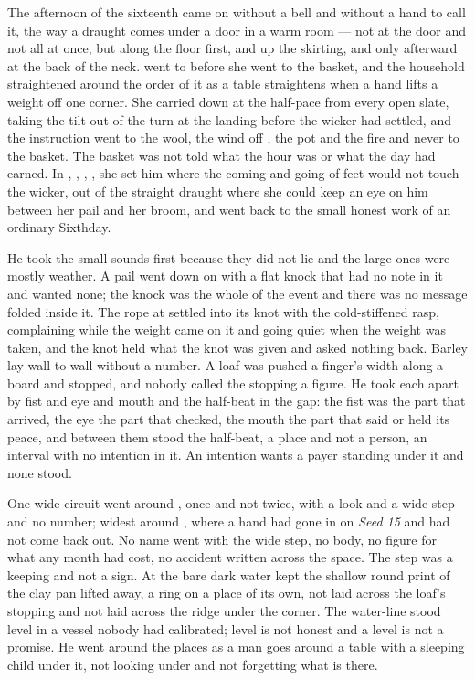 The afternoon of the sixteenth came on without a bell and without a hand to call it, the way a draught comes under a door in a warm room --- not at the door and not all at once, but along the floor first, and up the skirting, and only afterward at the back of the neck.  went to  before she went to the basket, and the household straightened around the order of it as a table straightens when a hand lifts a weight off one corner. She carried  down  at the half-pace from every open slate, taking the tilt out of the turn at the landing before the wicker had settled, and the instruction went to the wool, the wind off , the pot and the fire and never to the basket. The basket was not told what the hour was or what the day had earned. In , , , , she set him where the coming and going of feet would not touch the wicker, out of the straight draught where she could keep an eye on him between her pail and her broom, and went back to the small honest work of an ordinary Sixthday.

He took the small sounds first because they did not lie and the large ones were mostly weather. A pail went down on  with a flat knock that had no note in it and wanted none; the knock was the whole of the event and there was no message folded inside it. The rope at  settled into its knot with the cold-stiffened rasp, complaining while the weight came on it and going quiet when the weight was taken, and the knot held what the knot was given and asked nothing back. Barley lay wall to wall without a number. A loaf was pushed a finger's width along a board and stopped, and nobody called the stopping a figure. He took each apart by fist and eye and mouth and the half-beat in the gap: the fist was the part that arrived, the eye the part that checked, the mouth the part that said or held its peace, and between them stood the half-beat, a place and not a person, an interval with no intention in it. An intention wants a payer standing under it and none stood.

One wide circuit went around , once and not twice, with a look and a wide step and no number; widest around , where a hand had gone in on \emph{Seed 15} and had not come back out. No name went with the wide step, no body, no figure for what any month had cost, no accident written across the space. The step was a keeping and not a sign. At  the bare dark water kept the shallow round print of the clay pan lifted away, a ring on a place of its own, not laid across the loaf's stopping and not laid across the ridge under the corner. The water-line stood level in a vessel nobody had calibrated; level is not honest and a level is not a promise. He went around the places as a man goes around a table with a sleeping child under it, not looking under and not forgetting what is there.

